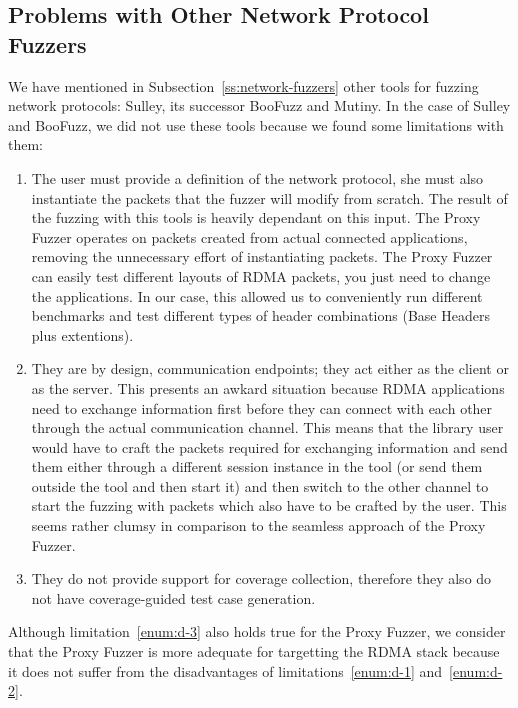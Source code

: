 \subsection{Problems with Other Network Protocol Fuzzers}\label{ss:prob-nw-fuzzers}

We have mentioned in Subsection~\ref{ss:network-fuzzers} other tools for fuzzing network protocols: Sulley, its successor
BooFuzz and Mutiny. In the case of Sulley and
BooFuzz, we did not use these tools because we found some limitations with them:

\begin{enumerate}
   \item The user must provide a definition of the network protocol, she must also instantiate the packets that the fuzzer will modify from scratch. The result of the fuzzing with this tools is heavily dependant on this input. The Proxy Fuzzer operates on packets created from actual connected applications, removing the unnecessary effort of instantiating packets. The Proxy Fuzzer can easily test different layouts of RDMA packets, you just need to change the applications. In our case, this allowed us to conveniently run different benchmarks and test different types of header combinations (Base Headers plus extentions).\label{enum:d-1}
   \item They are by design, communication endpoints; they act either as the client or as the server. This presents an awkard situation because RDMA applications need to exchange information first before they can connect with each other through the actual communication channel. This means that the library user would have to craft the packets required for exchanging information and send them either through a different session instance in the tool (or send them outside the tool and then start it)  and then switch to the other channel to start the fuzzing with packets which also have to be crafted by the user. This seems rather clumsy in comparison to the seamless approach of the Proxy Fuzzer.\label{enum:d-2}
   \item They do not provide support for coverage collection, therefore they also do not have coverage-guided test case generation.\label{enum:d-3}
\end{enumerate}

Although limitation~\ref{enum:d-3} also holds true for the Proxy Fuzzer, we consider that the Proxy Fuzzer is more adequate for
targetting the RDMA stack because it does not suffer from the disadvantages of limitations~\ref{enum:d-1} and~\ref{enum:d-2}.

